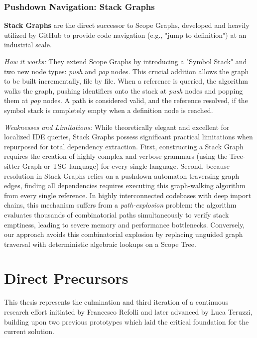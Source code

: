 \subsubsection{Pushdown Navigation: Stack Graphs}
\label{sec:stack_graphs}

\textbf{Stack Graphs} \cite{creager_stack_2023} are the direct
successor to Scope Graphs, developed and heavily utilized by GitHub
to provide code navigation (e.g., "jump to definition") at an industrial scale.

\textit{How it works:} They extend Scope Graphs by introducing a
"Symbol Stack" and two new node types: \textit{push} and \textit{pop}
nodes. This crucial addition allows the graph to be built
incrementally, file by file. When a reference is queried, the
algorithm walks the graph, pushing identifiers onto the stack at
\textit{push} nodes and popping them at \textit{pop} nodes. A path is
considered valid, and the reference resolved, if the symbol stack is
completely empty when a definition node is reached.

\textit{Weaknesses and Limitations:} While theoretically elegant and
excellent for localized IDE queries, Stack Graphs possess significant
practical limitations when repurposed for total dependency
extraction. First, constructing a Stack Graph requires the creation
of highly complex and verbose grammars (using the Tree-sitter Graph
or TSG language) for every single language. Second, because
resolution in Stack Graphs relies on a pushdown automaton traversing
graph edges, finding all dependencies requires executing this
graph-walking algorithm from every single reference. In highly
interconnected codebases with deep import chains, this mechanism
suffers from a \textit{path-explosion} problem: the algorithm
evaluates thousands of combinatorial paths simultaneously to verify
stack emptiness, leading to severe memory and performance
bottlenecks. Conversely, our approach avoids this combinatorial
explosion by replacing unguided graph traversal with deterministic
algebraic lookups on a Scope Tree.

\section{Direct Precursors}
\label{sec:precursors}

This thesis represents the culmination and third iteration of a
continuous research effort initiated by Francesco Refolli and later
advanced by Luca Teruzzi, building upon two previous prototypes
which laid the critical foundation for the current solution.

